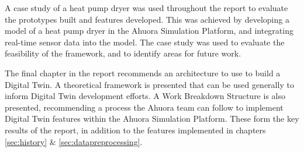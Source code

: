 A case study of a heat pump dryer was used throughout the report to evaluate the prototypes built and features developed.  This was achieved by developing a model of a heat pump dryer in the Ahuora Simulation Platform, and integrating real-time sensor data into the model. The case study was used to evaluate the feasibility of the framework, and to identify areas for future work.

The final chapter in the report recommends an architecture to use to build a Digital Twin. A theoretical framework is presented that can be used generally to inform Digital Twin development efforts. A Work Breakdown Structure is also presented, recommending a process the Ahuora team can follow to implement Digital Twin features within the Ahuora Simulation Platform. These form the key results of the report, in addition to the features implemented in chapters \ref{sec:history} \& \ref{sec:datapreprocessing}.
